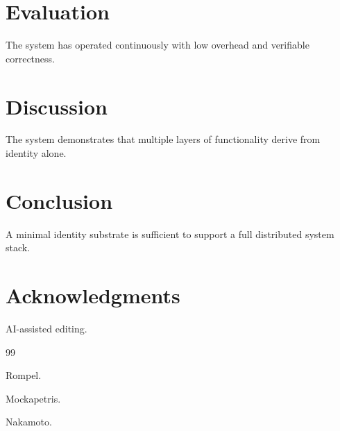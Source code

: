 \documentclass[11pt,a4paper]{article}
\begin{document}
\section{Evaluation}

The system has operated continuously with low overhead and verifiable correctness.

\section{Discussion}

The system demonstrates that multiple layers of functionality derive from identity alone.

\section{Conclusion}

A minimal identity substrate is sufficient to support a full distributed system stack.

\section*{Acknowledgments}

AI-assisted editing.

\begin{thebibliography}{99}

Rompel.

Mockapetris.

Nakamoto.

\end{thebibliography}
\end{document}
